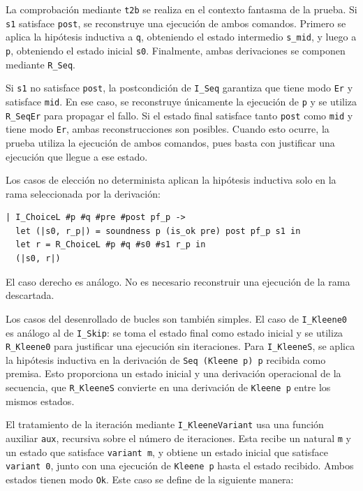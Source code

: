 \documentclass[a4paper,	11pt]{report}
\begin{document}
La comprobación mediante \lstinline|t2b| se realiza en el contexto fantasma de la prueba.
Si \lstinline|s1| satisface \lstinline|post|,
se reconstruye una ejecución de ambos comandos.
Primero se aplica la hipótesis inductiva a \lstinline|q|,
obteniendo el estado intermedio \lstinline|s_mid|,
y luego a \lstinline|p|,
obteniendo el estado inicial \lstinline|s0|.
Finalmente,
ambas derivaciones se componen mediante \lstinline|R_Seq|.

Si \lstinline|s1| no satisface \lstinline|post|,
la postcondición de \lstinline|I_Seq| garantiza que tiene modo \lstinline|Er| y satisface \lstinline|mid|.
En ese caso,
se reconstruye únicamente la ejecución de \lstinline|p| y se utiliza \lstinline|R_SeqEr| para propagar el fallo.
Si el estado final satisface tanto \lstinline|post| como \lstinline|mid| y tiene modo \lstinline|Er|,
ambas reconstrucciones son posibles.
Cuando esto ocurre,
la prueba utiliza la ejecución de ambos comandos,
pues basta con justificar una ejecución que llegue a ese estado.

Los casos de elección no determinista aplican la hipótesis inductiva solo en la rama seleccionada por la derivación:

\begin{lstlisting}
| I_ChoiceL #p #q #pre #post pf_p ->
  let (|s0, r_p|) = soundness p (is_ok pre) post pf_p s1 in
  let r = R_ChoiceL #p #q #s0 #s1 r_p in
  (|s0, r|)
\end{lstlisting}
El caso derecho es análogo.
No es necesario reconstruir una ejecución de la rama descartada.

Los casos del desenrollado de bucles son también simples.
El caso de \lstinline|I_Kleene0| es análogo al de \lstinline|I_Skip|:
se toma el estado final como estado inicial y se utiliza \lstinline|R_Kleene0| para justificar una ejecución sin iteraciones.
Para \lstinline|I_KleeneS|,
se aplica la hipótesis inductiva en la derivación de \lstinline|Seq (Kleene p) p| recibida como premisa.
Esto proporciona un estado inicial y una derivación operacional de la secuencia,
que \lstinline|R_KleeneS| convierte en una derivación de \lstinline|Kleene p| entre los mismos estados.

El tratamiento de la iteración mediante \lstinline|I_KleeneVariant| usa una función auxiliar \lstinline|aux|,
recursiva sobre el número de iteraciones.
Esta recibe un natural \lstinline|m| y un estado que satisface \lstinline|variant m|,
y obtiene un estado inicial que satisface \lstinline|variant 0|,
junto con una ejecución de \lstinline|Kleene p| hasta el estado recibido.
Ambos estados tienen modo \lstinline|Ok|.
Este caso se define de la siguiente manera:
\end{document}
